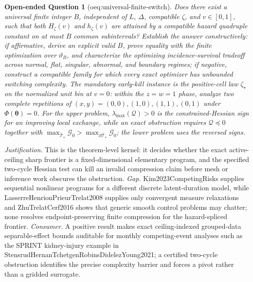 \documentclass{article}
\newtheorem{openendedquestion}{Open-ended Question}
\begin{document}
\begin{openendedquestion}[oeq:universal-finite-switch]\label{oeq:universal-finite-switch}
Does there exist a universal finite integer \(B\), independent of \(L\), \(\Delta\), compatible \(\zeta\), and \(v\in[0,1]\), such that both \(H_{\zeta}(v)\) and \(h_{\zeta}(v)\) are attained by a compatible hazard quadruple constant on at most \(B\) common subintervals? Establish the answer constructively: if affirmative, derive an explicit valid \(B\), prove equality with the finite optimization over \(\vartheta_B\), and characterize the optimizing incidence-survival tradeoff across normal, flat, singular, abnormal, and boundary regimes; if negative, construct a compatible family for which every exact optimizer has unbounded switching complexity. The mandatory early-kill instance is the positive-cell law \(\zeta_\star\) on the normalized unit bin at \(v=0\): within the \(z=w=1\) phase, analyze two complete repetitions of \((x,y)=(0,0),(1,0),(1,1),(0,1)\) under \(\Phi(\boldsymbol\theta)=0\). For the upper problem, \(\lambda_{\max}(\mathscr Q)>0\) is the constrained-Hessian sign for an improving local exchange, while an exact obstruction requires \(\mathscr Q\preceq0\) together with \(\max_{\overline{\mathcal T}_\star}\mathcal G_0>\max_{\partial\overline{\mathcal T}_\star}\mathcal G_0\); the lower problem uses the reversed signs.
\end{openendedquestion}
\par\smallskip\noindent \textit{Justification.} This is the theorem-level kernel: it decides whether the exact active-ceiling sharp frontier is a fixed-dimensional elementary program, and the specified two-cycle Hessian test can kill an invalid compression claim before mesh or inference work obscures the obstruction. \textit{Gap.} Kim2023CompetingRisks supplies sequential nonlinear programs for a different discrete latent-duration model, while LasserreHenrionPrieurTrelat2008 supplies only convergent measure relaxations and ZhuTrelatCerf2016 shows that generic smooth control problems may chatter; none resolves endpoint-preserving finite compression for the hazard-spliced frontier. \textit{Consumer.} A positive result makes exact ceiling-indexed grouped-data separable-effect bounds auditable for monthly competing-event analyses such as the SPRINT kidney-injury example in StensrudHernanTchetgenRobinsDidelezYoung2021; a certified two-cycle obstruction identifies the precise complexity barrier and forces a pivot rather than a gridded surrogate.
\end{document}
